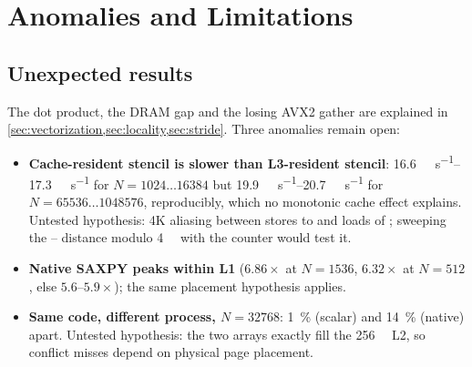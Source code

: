 \section{Anomalies and Limitations}\label{sec:anomalies}

\subsection{Unexpected results}
The dot product, the DRAM gap and the losing AVX2 gather are explained in
\cref{sec:vectorization,sec:locality,sec:stride}. Three anomalies remain open:
\begin{itemize}
  \item \textbf{Cache-resident stencil is slower than L3-resident stencil}:
        \qtyrange{16.6}{17.3}{\giga\flop\per\second} for $N=\num{1024}\ldots\num{16384}$ but
        \qtyrange{19.9}{20.7}{\giga\flop\per\second} for $N=\num{65536}\ldots\num{1048576}$,
        reproducibly, which no monotonic cache effect explains. Untested hypothesis: 4K aliasing
        between stores to  and loads of ; sweeping the --
        distance modulo \qty{4}{\kibi\byte} with the  counter
        would test it.
  \item \textbf{Native SAXPY peaks within L1} ($6.86\times$ at $N=\num{1536}$, $6.32\times$ at
        $N=512$, else $5.6\text{--}5.9\times$); the same placement hypothesis applies.
  \item \textbf{Same code, different process, $N=\num{32768}$}: \SI{1}{\percent} (scalar) and
        \SI{14}{\percent} (native) apart. Untested hypothesis: the two arrays exactly fill the
        \qty{256}{\kibi\byte} L2, so conflict misses depend on physical page placement.
\end{itemize}


